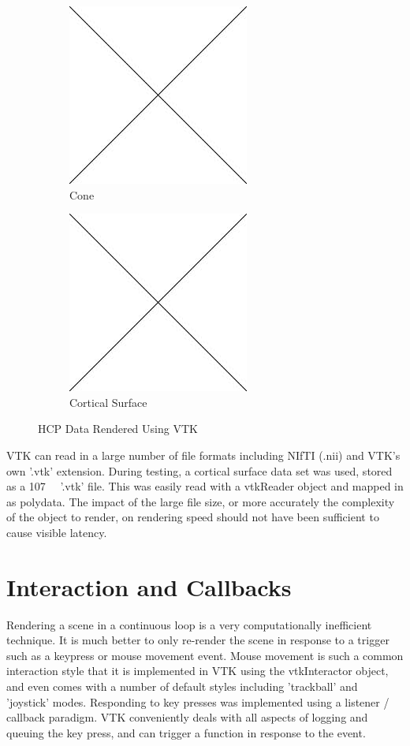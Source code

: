 \documentclass[MSc,paper=a4,pagesize=auto]{icldt}
\begin{document}
\begin{figure}[htbp!]
\centering
\begin{subfigure}{0.5\textwidth}
    \centering
    \includegraphics[width=0.4\linewidth]{resources/placeholder}
    \caption{Cone}
	\label{fig:sub1}
\end{subfigure}%
\centering
\begin{subfigure}{0.5\textwidth}
    \centering
    \includegraphics[width=0.4\linewidth]{resources/placeholder}
    \caption{Cortical Surface}
	\label{fig:sub2}
\end{subfigure}    
    \caption{HCP Data Rendered Using VTK}
    \label{fig:data_sources}
\end{figure}


VTK can read in a large number of file formats including NIfTI (.nii) and VTK's own '.vtk' extension. During testing, a cortical surface data set was used, stored as a \SI{107}{\mebi\byte} '.vtk' file. This was easily read with a vtkReader object and mapped in as polydata. The impact of the large file size, or more accurately the complexity of the object to render, on rendering speed should not have been sufficient to cause visible latency.

\section{Interaction and Callbacks}
Rendering a scene in a continuous loop is a very computationally inefficient technique. It is much better to only re-render the scene in response to a trigger such as a keypress or mouse movement event. Mouse movement is such a common interaction style that it is implemented in VTK using the vtkInteractor object, and even comes with a number of default styles including 'trackball' and 'joystick' modes. Responding to key presses was implemented using a listener  / callback paradigm. VTK conveniently deals with all aspects of logging and queuing the key press, and can trigger a function in response to the event. 
\end{document}
